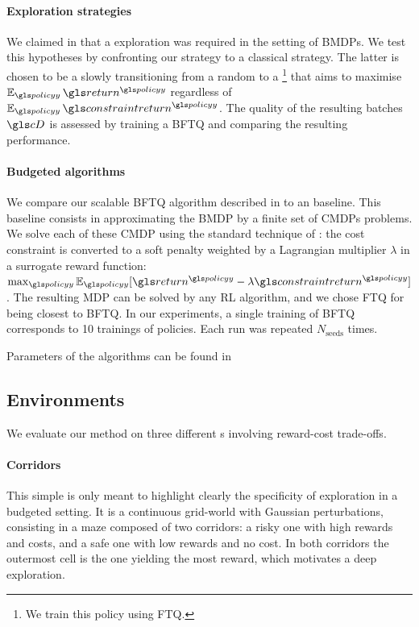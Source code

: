 \paragraph{Exploration strategies}\label{par:ex-explo} We claimed in  that a  exploration was required in the setting of \glspl{BMDP}. We test this hypotheses by confronting our strategy to a classical  strategy. The latter is chosen to be a   slowly transitioning from a random to a  \footnote{We train this  policy using \gls{FTQ}.} that aims to maximise $\expectedvalue_{\policy} \return^{\policy}$ regardless of $\expectedvalue_{\policy} \constraintreturn^{\policy}$. The quality of the resulting batches $\cD$ is assessed by training a \gls{BFTQ}  and comparing the resulting performance.

\paragraph{Budgeted algorithms}\label{par:ex-brl} We compare our scalable \gls{BFTQ} algorithm described in  to an \FTQl baseline. This baseline consists in approximating the \gls{BMDP} by a finite set of \glspl{CMDP} problems. We solve each of these \gls{CMDP} using the standard technique of : the cost constraint is converted to a soft penalty weighted by a Lagrangian multiplier $\lambda$ in a surrogate reward function: $\max_{\policy} \expectedvalue_{\policy}[\return^{\policy} - \lambda \constraintreturn^{\policy}]$. The resulting MDP can be solved by any RL algorithm, and we chose \gls{FTQ} for being closest to \gls{BFTQ}.
In our experiments, a single training of \gls{BFTQ} corresponds to 10 trainings of \FTQl policies. Each run was repeated $N_{\text{seeds}}$ times.

Parameters of the algorithms can be found in 

\subsection{Environments}
\label{subsec:environments}
We evaluate our method on three different s involving reward-cost trade-offs.

\paragraph{Corridors}
This simple  is only meant to highlight clearly the specificity of exploration in a budgeted setting. It is a continuous grid-world with Gaussian perturbations, consisting in a maze composed of two corridors: a risky one with high rewards and costs, and a safe one with low rewards and no cost. In both corridors the outermost cell is the one yielding the most reward, which motivates a deep exploration.


